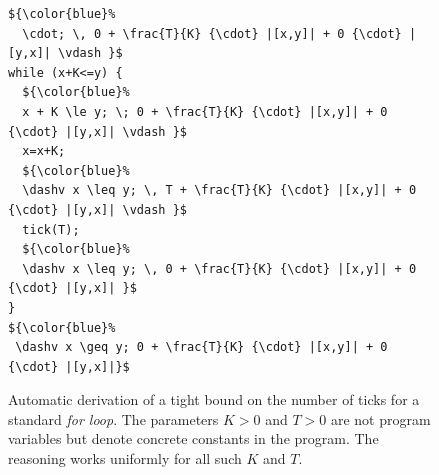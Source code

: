 \documentclass[nocopyrightspace,preprint,pldi]{sigplanconf-pldi15}
\begin{document}

\begin{figure}[t]
  \centering
\begin{lstlisting}[mathescape]
${\color{blue}%
  \cdot; \, 0 + \frac{T}{K} {\cdot} |[x,y]| + 0 {\cdot} |[y,x]| \vdash }$
while (x+K<=y) {
  ${\color{blue}%
  x + K \le y; \; 0 + \frac{T}{K} {\cdot} |[x,y]| + 0 {\cdot} |[y,x]| \vdash }$
  x=x+K;
  ${\color{blue}%
  \dashv x \leq y; \, T + \frac{T}{K} {\cdot} |[x,y]| + 0 {\cdot} |[y,x]| \vdash }$
  tick(T);
  ${\color{blue}%
  \dashv x \leq y; \, 0 + \frac{T}{K} {\cdot} |[x,y]| + 0 {\cdot} |[y,x]| }$
}
${\color{blue}%
 \dashv x \geq y; 0 + \frac{T}{K} {\cdot} |[x,y]| + 0 {\cdot} |[y,x]|}$
\end{lstlisting}
  \caption{Automatic derivation of a tight bound on the number of
    ticks for a standard \emph{for loop}.  The parameters $K>0$ and
    $T>0$ are not program variables but denote concrete constants in
    the program.  The reasoning works uniformly for all such $K$ and
    $T$.}
  \label{fig:ex1}
\end{figure}


%
\newlength{\progwidth}
\end{document}
